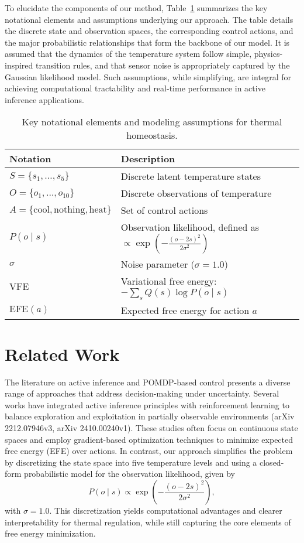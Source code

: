\documentclass[11pt]{article}
\begin{document}
To elucidate the components of our method, Table~\ref{tab:notation} summarizes the key notational elements and assumptions underlying our approach. The table details the discrete state and observation spaces, the corresponding control actions, and the major probabilistic relationships that form the backbone of our model. It is assumed that the dynamics of the temperature system follow simple, physics-inspired transition rules, and that sensor noise is appropriately captured by the Gaussian likelihood model. Such assumptions, while simplifying, are integral for achieving computational tractability and real-time performance in active inference applications.
  
\begin{table}[H]
\centering
\begin{tabular}{l l}
\hline
Notation & Description \\
\hline
\(S = \{s_1, \dots, s_5\}\) & Discrete latent temperature states \\
\(O = \{o_1, \dots, o_{10}\}\) & Discrete observations of temperature \\
\(A = \{\text{cool}, \text{nothing}, \text{heat}\}\) & Set of control actions \\
\(P(o \mid s)\) & Observation likelihood, defined as \(\propto \exp\left(-\frac{(o-2s)^2}{2\sigma^2}\right)\) \\
\(\sigma\) & Noise parameter (\(\sigma=1.0\)) \\
\(\text{VFE}\) & Variational free energy: \(-\sum_{s} Q(s)\log P(o \mid s)\) \\
\(\text{EFE}(a)\) & Expected free energy for action \(a\) \\
\hline
\end{tabular}
\caption{Key notational elements and modeling assumptions for thermal homeostasis.}
\label{tab:notation}
\end{table}

\section{Related Work}
The literature on active inference and POMDP-based control presents a diverse range of approaches that address decision-making under uncertainty. Several works have integrated active inference principles with reinforcement learning to balance exploration and exploitation in partially observable environments (arXiv 2212.07946v3, arXiv 2410.00240v1). These studies often focus on continuous state spaces and employ gradient-based optimization techniques to minimize expected free energy (EFE) over actions. In contrast, our approach simplifies the problem by discretizing the state space into five temperature levels and using a closed-form probabilistic model for the observation likelihood, given by 
\[
P(o\mid s) \propto \exp\left(-\frac{(o-2s)^2}{2\sigma^2}\right),
\]
with \(\sigma=1.0\). This discretization yields computational advantages and clearer interpretability for thermal regulation, while still capturing the core elements of free energy minimization.
\end{document}
